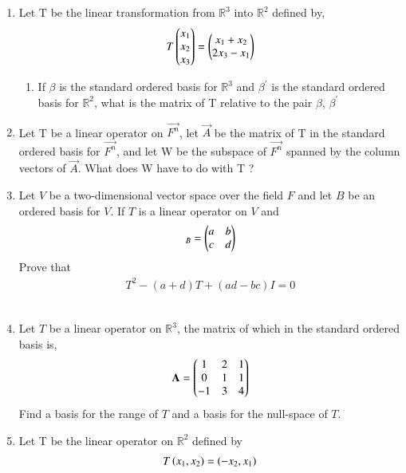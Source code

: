 \begin{enumerate}[label=\thesubsection.\arabic*.,ref=\thesubsection.\theenumi]
\item    Let T be the linear transformation from $\mathbb{R}^3$ into $\mathbb{R}^2$ defined by,
   \begin{align}
   T\begin{pmatrix}x_1\\x_2\\x_3\end{pmatrix}=\begin{pmatrix}x_1+x_2\\2x_3-x_1\end{pmatrix}
   \end{align}
\begin{enumerate}

\item    If $\beta$ is the standard ordered basis for $\mathbb{R}^3$ and $\beta^{\prime}$ is the standard ordered basis for $\mathbb{R}^2$, what is the matrix of T relative to the pair $\beta$, $\beta^{'}$
\end{enumerate}

\item Let T be a linear operator on $\vec{F^n}$, let $\vec{A}$ be the matrix of T in the standard ordered basis for $\vec{F^n}$, and let W be the subspace of $\vec{F^n}$ spanned by the column vectors of $\vec{A}$. What does W have to do with T ?
%
\\
\solution

%
\item Let $V$ be a two-dimensional vector space over the field $F$ and let $B$ be an ordered basis for $V$. If $T$ is a linear operator on $V$ and 
\begin{align}
[T]_B = \myvec{a & b\\c & d}
\end{align}
Prove that 
\begin{align}
T^2 - (a+d)T + (ad-bc)I = 0
\end{align}
%
\\
\solution

\item Let $T$ be a linear operator on $\mathbb{R}^3$, the matrix of which in the standard ordered basis is,
\begin{align}
\mathbf{A} = \begin{pmatrix}1&2&1\\0&1&1\\-1&3&4\end{pmatrix} 
\end{align}
Find a basis for the range of $T$ and a basis for the null-space of $T$.
%
\\
\solution

\item Let T be the linear operator on $\mathbb{R}^2$ defined by
\begin{align}
T\brak{x_1,x_2}=\brak{-x_2,x_1}\label{eq:solutions/3/4/6/c/Tx}

\end{align}
\end{enumerate}
